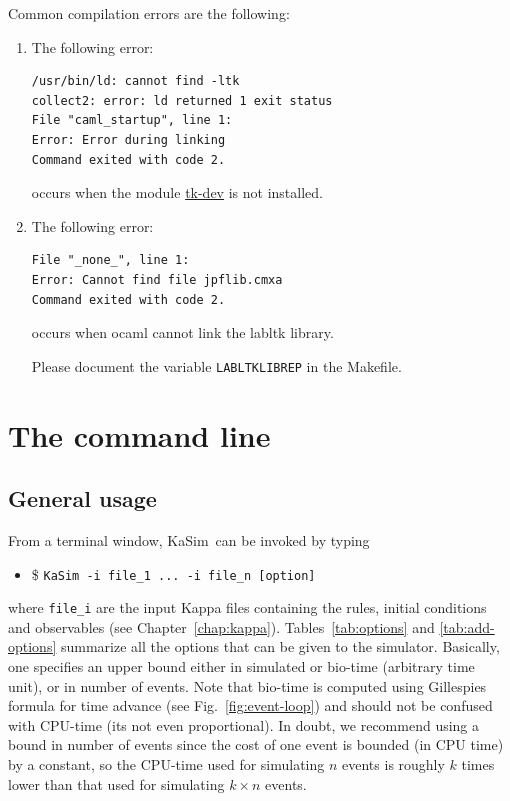 \documentclass[11pt]{book}
\def\KaSim{\textsf{KaSim}}
\def\ttt#1{\texttt{#1}}
\def\ITE#1{\begin{itemize}#1\end{itemize}}
\begin{document}
Common compilation errors are the following:
\begin{enumerate}
\item The following error: 

\begin{verbatim}
/usr/bin/ld: cannot find -ltk
collect2: error: ld returned 1 exit status
File "caml_startup", line 1:
Error: Error during linking
Command exited with code 2.
\end{verbatim}

occurs when the module  \href{http://www.tcl.tk/}{tk-dev} is not installed. 
\item The following error:

\begin{verbatim}
File "_none_", line 1:
Error: Cannot find file jpflib.cmxa
Command exited with code 2.
\end{verbatim}

occurs when ocaml cannot link the labltk library. 

Please document the variable \texttt{LABLTKLIBREP} in the Makefile. 

\end{enumerate}





\chapter{The command line}\label{chap:cl}

\section{General usage}
From a terminal window, \KaSim~can be invoked by typing 
\ITE{
\item[\$] \ttt{KaSim -i file\_1 ... -i file\_n [option] }
}
where \ttt{file\_i} are the input Kappa files containing the rules, initial conditions and observables (see Chapter~\ref{chap:kappa}). Tables~\ref{tab:options} and \ref{tab:add-options} summarize all the options that can be given to the simulator. Basically, one specifies an upper bound either in simulated or bio-time (arbitrary time unit), or in number of events. Note that bio-time is computed using Gillespie{\textquotesingle}s formula for time advance (see Fig.~\ref{fig:event-loop}) and should not be confused with CPU-time (it{\textquotesingle}s not even proportional). In doubt, we recommend using a bound in number of events since the cost of one event is bounded (in CPU time) by a constant, so the CPU-time used for simulating $n$ events is roughly $k$ times lower than that used for simulating $k\times n$ events.
\end{document}

